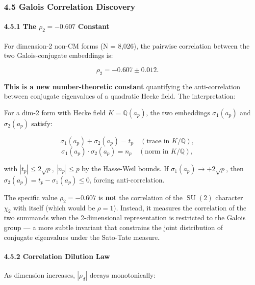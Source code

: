 \documentclass[
]{article}
\begin{document}
\hypertarget{galois-correlation-discovery}{%
\subsubsection{4.5 Galois Correlation
Discovery}\label{galois-correlation-discovery}}

\hypertarget{the-rho_2--0.607-constant}{%
\paragraph{\texorpdfstring{4.5.1 The \(\rho_2 = -0.607\)
Constant}{4.5.1 The \textbackslash rho\_2 = -0.607 Constant}}\label{the-rho_2--0.607-constant}}

For dimension-2 non-CM forms (N = 8,026), the pairwise correlation
between the two Galois-conjugate embeddings is:

\[\rho_2 = -0.607 \pm 0.012.\]

\textbf{This is a new number-theoretic constant} quantifying the
anti-correlation between conjugate eigenvalues of a quadratic Hecke
field. The interpretation:

For a dim-2 form with Hecke field \(K = \mathbb{Q}(a_p)\), the two
embeddings \(\sigma_1(a_p)\) and \(\sigma_2(a_p)\) satisfy:

\[\sigma_1(a_p) + \sigma_2(a_p) = t_p \quad (\text{trace in } K/\mathbb{Q}),\]
\[\sigma_1(a_p) \cdot \sigma_2(a_p) = n_p \quad (\text{norm in } K/\mathbb{Q}),\]

with \(|t_p| \le 2\sqrt{p}\), \(|n_p| \le p\) by the Hasse-Weil bounds.
If \(\sigma_1(a_p) \to +2\sqrt{p}\), then
\(\sigma_2(a_p) = t_p - \sigma_1(a_p) \le 0\), forcing anti-correlation.

The specific value \(\rho_2 = -0.607\) is \textbf{not} the correlation
of the \(\operatorname{SU}(2)\) character \(\chi_2\) with itself (which
would be \(\rho = 1\)). Instead, it measures the correlation of the two
summands when the 2-dimensional representation is restricted to the
Galois group --- a more subtle invariant that constrains the joint
distribution of conjugate eigenvalues under the Sato-Tate measure.

\hypertarget{correlation-dilution-law}{%
\paragraph{4.5.2 Correlation Dilution
Law}\label{correlation-dilution-law}}

As dimension increases, \(|\rho_d|\) decays monotonically:
\end{document}
